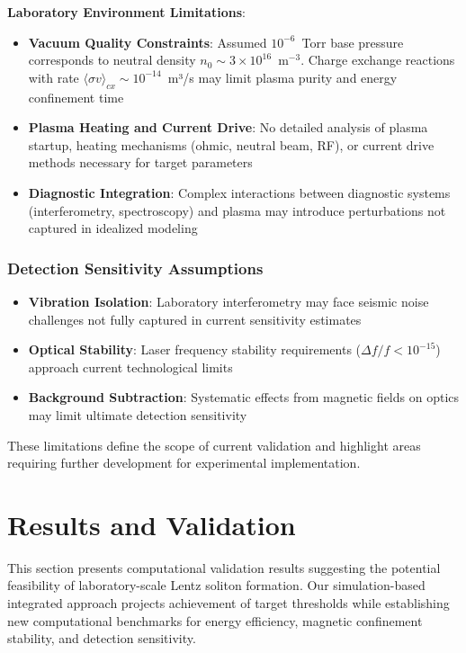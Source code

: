 \documentclass[12pt,a4paper]{article}
\begin{document}
\textbf{Laboratory Environment Limitations}:
\begin{itemize}
\item \textbf{Vacuum Quality Constraints}: Assumed $10^{-6}$~Torr base pressure corresponds to neutral density $n_0 \sim 3 \times 10^{16}$~m$^{-3}$. Charge exchange reactions with rate $\langle\sigma v\rangle_{cx} \sim 10^{-14}$~m³/s may limit plasma purity and energy confinement time
\item \textbf{Plasma Heating and Current Drive}: No detailed analysis of plasma startup, heating mechanisms (ohmic, neutral beam, RF), or current drive methods necessary for target parameters
\item \textbf{Diagnostic Integration}: Complex interactions between diagnostic systems (interferometry, spectroscopy) and plasma may introduce perturbations not captured in idealized modeling
\end{itemize}

\subsubsection{Detection Sensitivity Assumptions}
\begin{itemize}
\item \textbf{Vibration Isolation}: Laboratory interferometry may face seismic noise challenges not fully captured in current sensitivity estimates
\item \textbf{Optical Stability}: Laser frequency stability requirements ($\Delta f/f < 10^{-15}$) approach current technological limits
\item \textbf{Background Subtraction}: Systematic effects from magnetic fields on optics may limit ultimate detection sensitivity
\end{itemize}

These limitations define the scope of current validation and highlight areas requiring further development for experimental implementation.

\section{Results and Validation}

This section presents computational validation results suggesting the potential feasibility of laboratory-scale Lentz soliton formation. Our simulation-based integrated approach projects achievement of target thresholds while establishing new computational benchmarks for energy efficiency, magnetic confinement stability, and detection sensitivity.
\end{document}
